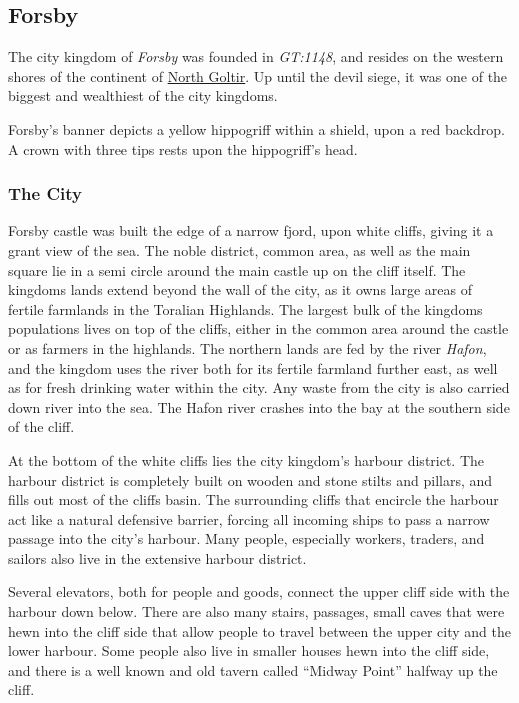 \subsection{Forsby}
\label{sec:Forsby}


The city kingdom of \emph{Forsby} was founded in \emph{GT:1148}, and resides
on the western shores of the continent of \hyperref[sec:Goltir]{North Goltir}.
Up until the devil siege, it was one of the biggest and wealthiest of the city
kingdoms.

Forsby's banner depicts a yellow hippogriff within a shield, upon a red
backdrop. A crown with three tips rests upon the hippogriff's head.

\subsubsection{The City}

Forsby castle was built the edge of a narrow fjord, upon white cliffs, giving
it a grant view of the sea. The noble district, common area, as well as the
main square lie in a semi circle around the main castle up on the cliff
itself. The kingdoms lands extend beyond the wall of the city, as it owns
large areas of fertile farmlands in the Toralian Highlands. The largest
bulk of the kingdoms populations lives on top of the cliffs, either in the
common area around the castle or as farmers in the highlands. The northern
lands are fed by the river \emph{Hafon}, and the kingdom uses the river both
for its fertile farmland further east, as well as for fresh drinking water
within the city. Any waste from the city is also carried down river into the
sea. The Hafon river crashes into the bay at the southern side of the cliff.

At the bottom of the white cliffs lies the city kingdom's harbour district. The
harbour district is completely built on wooden and stone stilts and pillars,
and fills out most of the cliffs basin. The surrounding cliffs that encircle
the harbour act like a natural defensive barrier, forcing all incoming ships
to pass a narrow passage into the city's harbour. Many people, especially
workers, traders, and sailors also live in the extensive harbour district.

Several elevators, both for people and goods, connect the upper cliff side
with the harbour down below. There are also many stairs, passages, small caves
that were hewn into the cliff side that allow people to travel between the
upper city and the lower harbour. Some people also live in smaller houses hewn
into the cliff side, and there is a well known and old tavern called ``Midway
Point'' halfway up the cliff.


